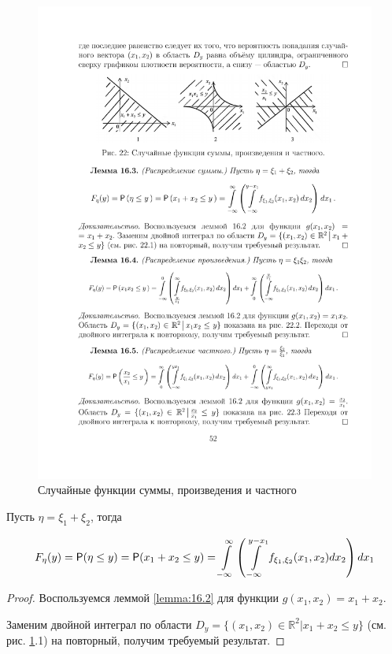 \begin{figure}[H]
	\centering
	\includegraphics[]{pic/pic22}
	\caption{Случайные функции суммы, произведения и частного}
	\label{fig22}
\end{figure}

\begin{lemma}
\label{lemma:16.3}
Пусть $\eta = \xi_1 + \xi_2$, тогда

\begin{gather*}
	F_\eta (y) = \P ( \eta \leq y ) = \P(x_1+x_2 \leq y )=
	\int\limits_{-\infty}^{\infty}\left(
		\int\limits_{-\infty}^{y-x_1 } f_{\xi_1,\xi_2} (x_1 , x_2 ) dx_2
	\right)dx_1
\end{gather*}
\end{lemma}
\begin{proof}
Воспользуемся леммой \ref{lemma:16.2} для функции $g(x_1 , x_2 )=x_1 + x_2$. 

Заменим двойной интеграл по области $D_y = \{(x_1 , x_2 ) \in \mathbb{R}^2 | x_1 +
x_2 \leq y\}$ (см. рис. \ref{fig22}.1) на повторный, получим требуемый результат.	
\end{proof}

